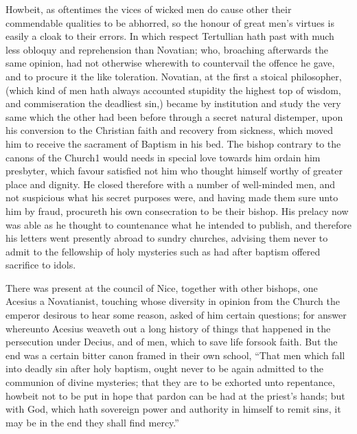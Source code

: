 Howbeit, as oftentimes the vices of wicked men do cause other their commendable qualities to be abhorred, so the honour of great men’s virtues is easily a cloak to their errors. In which respect Tertullian hath past with much less obloquy and reprehension than Novatian; who, broaching afterwards the same opinion, had not otherwise wherewith to countervail the offence he gave, and to procure it the like toleration. Novatian, at the first a stoical philosopher, (which kind of men hath always accounted stupidity the highest top of wisdom, and commiseration the deadliest sin,) became by institution and study the very same which the other had been before through a secret natural distemper, upon his conversion to the Christian faith and recovery from sickness, which moved him to receive the sacrament of Baptism in his bed. The bishop contrary to the canons of the Church1 would needs in special love towards him ordain him presbyter, which favour satisfied not him who thought himself worthy of greater place and dignity. He closed therefore with a number of well-minded men, and not suspicious what his secret purposes were, and having made them sure unto him by fraud, procureth his own consecration to be their bishop. His prelacy now was able as he thought to countenance what he intended to publish, and therefore his letters went presently abroad to sundry churches, advising them never to admit to the fellowship of holy mysteries such as had after baptism offered sacrifice to idols.

There was present at the council of Nice, together with other bishops, one Acesius a Novatianist, touching whose diversity in opinion from the Church the emperor desirous to hear some reason, asked of him certain questions; for answer whereunto Acesius weaveth out a long history of things that  happened in the persecution under Decius, and of men, which to save life forsook faith. But the end was a certain bitter canon framed in their own school, “That men which fall into deadly sin after holy baptism, ought never to be again admitted to the communion of divine mysteries; that they are to be exhorted unto repentance, howbeit not to be put in hope that pardon can be had at the priest’s hands; but with God, which hath sovereign power and authority in himself to remit sins, it may be in the end they shall find mercy.”

